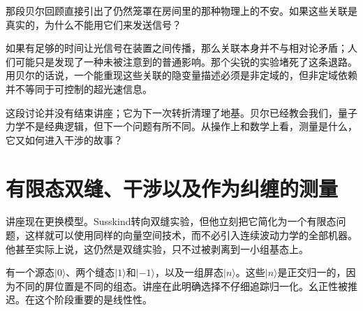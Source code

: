 \begin{classroomqa}
\end{classroomqa}

那段贝尔回顾直接引出了仍然笼罩在房间里的那种物理上的不安。如果这些关联是真实的，为什么不能用它们来发送信号？

\begin{classroomqa}
\end{classroomqa}

如果有足够的时间让光信号在装置之间传播，那么关联本身并不与相对论矛盾；人们可能只是发现了一种未被注意到的普通影响。那个尖锐的实验堵死了这条退路。用贝尔的话说，一个能重现这些关联的隐变量描述必须是非定域的，但非定域依赖并不等同于可控制的超光速信息。

\begin{classroomqa}
\end{classroomqa}

这段讨论并没有结束讲座；它为下一次转折清理了地基。贝尔已经教会我们，量子力学不是经典逻辑，但下一个问题有所不同。从操作上和数学上看，测量是什么，它又如何进入干涉的故事？

\section{有限态双缝、干涉以及作为纠缠的测量}

讲座现在更换模型。Susskind转向双缝实验，但他立刻把它简化为一个有限态问题，这样就可以使用同样的向量空间技术，而不必引入连续波动力学的全部机器。他甚至实际上说，这仍然是双缝实验，只不过被剥离到一小组基态上。

有一个源态\(|0\rangle\)、两个缝态\(|1\rangle\)和\(|-1\rangle\)，以及一组屏态\(|n\rangle\)。这些\(|n\rangle\)是正交归一的，因为不同的屏位置是不同的组态。讲座在此明确选择不仔细追踪归一化。幺正性被推迟。在这个阶段重要的是线性性。

